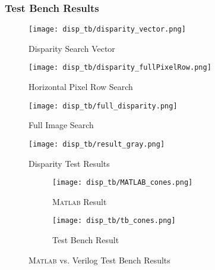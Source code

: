 \subsubsection{Test Bench Results}
\begin{figure}[H]
	\centerline{\texttt{[image: disp\_tb/disparity\_vector.png]}}
	\caption{Disparity Search Vector}
	\label{disparityVector}
\end{figure}

\begin{figure}[H]
	\centerline{\texttt{[image: disp\_tb/disparity\_fullPixelRow.png]}}
	\caption{Horizontal Pixel Row Search}
	\label{disparityRowSearch}
\end{figure}

\begin{figure}[H]
	\centerline{\texttt{[image: disp\_tb/full\_disparity.png]}}
	\caption{Full Image Search}
	\label{disparityFullSearch}
\end{figure}

\begin{figure}[H]
	\centerline{\texttt{[image: disp\_tb/result\_gray.png]}}
	\caption{Disparity Test Results}
	\label{disparityTestResults}
\end{figure}

\begin{figure}[H]
	 \begin{subfigure}[h]{1.0\textwidth}
             \centerline{\texttt{[image: disp\_tb/MATLAB\_cones.png]}}
             \caption{\textsc{Matlab} Result}
			\label{disparityMatlabResult}
         \end{subfigure} 
         \begin{subfigure}[h]{1.0\textwidth}
              \centerline{\texttt{[image: disp\_tb/tb\_cones.png]}}
             \caption{Test Bench Result}
			\label{disparityVerilogResult}
         \end{subfigure}
\label{disparityVerilogvsMatlab}
\caption{\textsc{Matlab} vs. Verilog Test Bench Results}
\end{figure}



